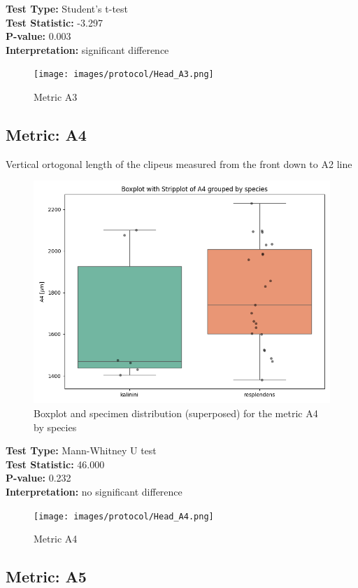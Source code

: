 \noindent\textbf{Test Type:} Student's t-test \\
\noindent\textbf{Test Statistic:} -3.297 \\
\noindent\textbf{P-value:} 0.003 \\
\noindent\textbf{Interpretation:} significant difference

\begin{figure}[H]
\centering
\texttt{[image: images/protocol/Head\_A3.png]}
\caption{ Metric A3}
\end{figure}

\newpage
\subsection*{Metric: A4}

Vertical ortogonal length of the clipeus measured from the front down to A2 line

\begin{figure}[H]
\centering
\includegraphics[width=0.7\linewidth]{images/boxplot/boxplot_A4.png}
\caption{  Boxplot and specimen distribution (superposed) for the metric  A4 by species}
\end{figure}

\noindent\textbf{Test Type:} Mann-Whitney U test \\
\noindent\textbf{Test Statistic:} 46.000 \\
\noindent\textbf{P-value:} 0.232 \\
\noindent\textbf{Interpretation:} no significant difference

\begin{figure}[H]
\centering
\texttt{[image: images/protocol/Head\_A4.png]}
\caption{ Metric A4}
\end{figure}

\newpage
\subsection*{Metric: A5}

